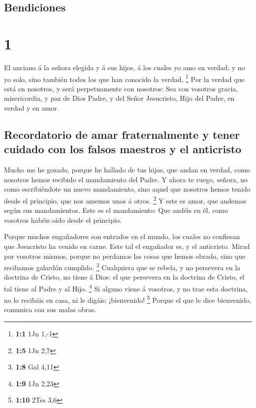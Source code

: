 \hypertarget{bendiciones}{%
\subsection{Bendiciones}\label{bendiciones}}

\hypertarget{section}{%
\section{1}\label{section}}

 El anciano á la señora elegida y á sus hijos, á los
cuales yo amo en verdad; y no yo solo, sino también todos los que han
conocido la verdad, \footnote{\textbf{1:1} 1Jn 1,-1}  Por
la verdad que está en nosotros, y será perpetuamente con nosotros:
 Sea con vosotros gracia, misericordia, y paz de Dios
Padre, y del Señor Jesucristo, Hijo del Padre, en verdad y en amor.

\hypertarget{recordatorio-de-amar-fraternalmente-y-tener-cuidado-con-los-falsos-maestros-y-el-anticristo}{%
\subsection{Recordatorio de amar fraternalmente y tener cuidado con los
falsos maestros y el
anticristo}\label{recordatorio-de-amar-fraternalmente-y-tener-cuidado-con-los-falsos-maestros-y-el-anticristo}}

 Mucho me he gozado, porque he hallado de tus hijos, que
andan en verdad, como nosotros hemos recibido el mandamiento del Padre.
 Y ahora te ruego, señora, no como escribiéndote un nuevo
mandamiento, sino aquel que nosotros hemos tenido desde el principio,
que nos amemos unos á otros. \footnote{\textbf{1:5} 1Jn 2,7}
 Y este es amor, que andemos según sus mandamientos. Este
es el mandamiento: Que andéis en él, como vosotros habéis oído desde el
principio.

 Porque muchos engañadores son entrados en el mundo, los
cuales no confiesan que Jesucristo ha venido en carne. Este tal el
engañador es, y el anticristo.  Mirad por vosotros mismos,
porque no perdamos las cosas que hemos obrado, sino que recibamos
galardón cumplido. \footnote{\textbf{1:8} Gal 4,11} 
Cualquiera que se rebela, y no persevera en la doctrina de Cristo, no
tiene á Dios: el que persevera en la doctrina de Cristo, el tal tiene al
Padre y al Hijo. \footnote{\textbf{1:9} 1Jn 2,23}  Si
alguno viene á vosotros, y no trae esta doctrina, no lo recibáis en
casa, ni le digáis: ¡bienvenido! \footnote{\textbf{1:10} 2Tes 3,6}
 Porque el que le dice bienvenido, comunica con sus malas
obras.

